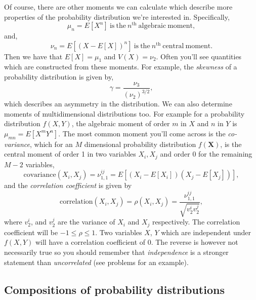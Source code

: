 Of course, there are other moments we can calculate which describe more properties of the probability distribution we're interested in. Specifically, 
\begin{equation}
    \mu_{n} = E[X^{n}] ~ \mathrm{is~the}~n^{\mathrm{th}}~\mathrm{algebraic~moment},
\end{equation}
and,
\begin{equation}
    \nu_{n} = E[(X-E[X])^{n}] ~ \mathrm{is~the}~n^{\mathrm{th}}~\mathrm{central~ moment}.
\end{equation}
Then we have that $E[X]=\mu_{1}$ and $V(X)=\nu_{2}$.
Often you'll see quantities which are constructed from these moments. For example, the \emph{skewness} of a probability distribution is given by, 
\begin{equation}
    \gamma = \frac{\nu_{3}}{(\nu_2)^{3/2}},
\end{equation}
which describes an asymmetry in the distribution. 
We can also determine moments of multidimensional distributions too. For example for a probability distribution $f(X,Y)$, the algebraic moment of order $m$ in $X$ and $n$ in $Y$ is $\mu_{mn}=E[X^{m}Y^{n}]$. The most common moment you'll come across is the \emph{co-variance}, which for an $M$ dimensional probability distribution $f(\mathbf{X})$, is the central moment of order 1 in two variables $X_{i}, X_{j}$ and order 0 for the remaining $M-2$ variables, 
\begin{equation}
    \mathrm{covariance}(X_{i},X_{j}) = \nu^{ij}_{1,1} = E[(X_{i}-E[X_{i}])(X_{j}-E[X_{j}])], 
\end{equation}
and the \emph{correlation coefficient} is given by 
\begin{equation}
    \mathrm{correlation}(X_{i},X_{j}) = \rho(X_{i},X_{j}) = \frac{\nu^{ij}_{1,1}}{\sqrt{v^{i}_{2}v^{j}_{2}}} , 
\end{equation}
where $v^{i}_{2}$, and $v^{j}_{2}$ are the variance of $X_{i}$ and $X_{j}$ respectively. The correlation coefficient will be $-1\leq \rho \leq 1$. 
Two variables $X$, $Y$ which are independent under $f(X,Y)$ will have a correlation coefficient of 0. The reverse is however not necessarily true so you should remember that \emph{independence} is a stronger statement than \emph{uncorrelated} (see problems for an example).  

\subsection{Compositions of probability distributions}

